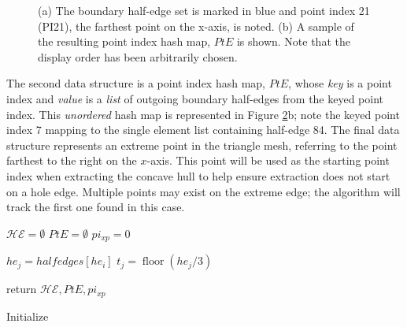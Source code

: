 \begin{figure}[ht]
\begin{subfigure}[t]{.25\linewidth}
    \caption{}
    \label{fig:ch2_hashmap}
  \end{subfigure}
  \caption[Representation of boundary half-edge set, extreme point, and point index hash map]{(a) The boundary half-edge set is marked in blue and point index 21 (PI21), the farthest point on the x-axis, is noted. (b) A sample of the resulting point index hash map, $PtE$ is shown. Note that the display order has been arbitrarily chosen.  }
  \label{fig:ch2_algorithm1_visual} 
\end{figure}

The second data structure is a point index hash map, $PtE$, whose \emph{key} is a point index and \emph{value} is a \emph{list} of outgoing boundary half-edges from the keyed point index. This \emph{unordered} hash map is represented in Figure \ref{fig:ch2_algorithm1_visual}b; note the keyed point index 7 mapping to the single element list containing half-edge 84. The final data structure represents an extreme point in the triangle mesh, referring to the point farthest to the right on the $x$-axis. This point will be used as the starting point index when extracting the concave hull to help ensure extraction does not start on a hole edge. Multiple points may exist on the extreme edge;  the algorithm will track the first one found in this case. 

\begin{algorithm}[ht]

    
    $\mathcal{HE} = \emptyset$ 
    $PtE = \emptyset$ 
    $pi_{xp} = 0$ 
     { 
         { 
            $he_j = halfedges[he_i]$
            $t_j = \operatorname{floor}(he_j / 3)$ 
        }
  
    }
    return $\mathcal{HE}, PtE, pi_{xp}$
    \caption{Initialize}\label{alg:ch2_boundary_edges}
\end{algorithm}


